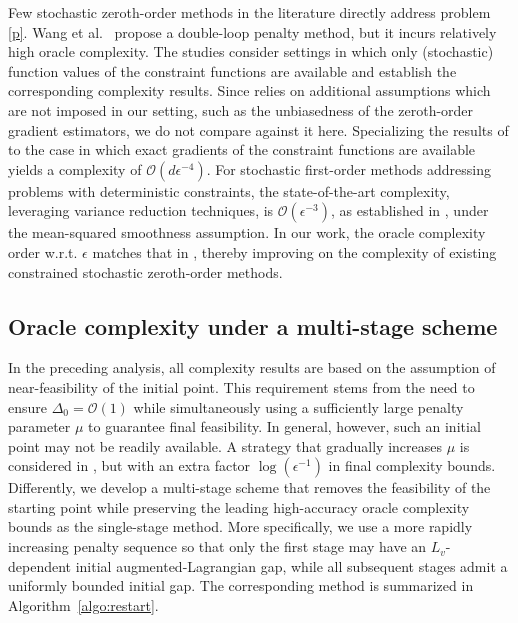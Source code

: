 \documentclass[11pt]{article}
\numberwithin{equation}{section}
\begin{document}
Few stochastic zeroth-order methods in the literature directly address problem \eqref{p}. Wang et al.~\cite{wang2017penalty} propose a double-loop penalty method, but it incurs relatively high oracle complexity. The studies \cite{nguyen2022stochastic,SGG} consider settings in which only (stochastic) function values of the constraint functions are available and establish the corresponding complexity results. {Since \cite{SGG} relies on additional assumptions which are not imposed in our setting, such as the unbiasedness of the zeroth-order gradient estimators,} we do not compare against it here. Specializing the results of \cite{nguyen2022stochastic} to the case in which exact gradients of the constraint functions are available yields a complexity of \(\mathcal{O}(d \epsilon^{-4})\).
For stochastic first-order methods addressing problems with deterministic constraints, the state-of-the-art complexity, leveraging variance reduction techniques, is \(\mathcal{O}(\epsilon^{-3})\), as established in \cite{SWW,lu2026variance}, under the mean-squared smoothness assumption.
In our work, the oracle complexity order w.r.t. $\epsilon$ matches that in \cite{SWW,lu2026variance}, thereby improving on the complexity of existing constrained stochastic zeroth-order methods.


\subsection{Oracle complexity under a multi-stage scheme}
In the preceding analysis, all complexity results are based on the assumption of near-feasibility of the initial point. This requirement  stems from the need to ensure \(\Delta_0=\mathcal O(1)\) while simultaneously using a sufficiently large penalty parameter \(\mu\) to guarantee final feasibility. In general, however, such an initial point may not be readily available. A  strategy that gradually increases \(\mu\) is considered in \cite{alacaoglu2024complexity}, but with an extra factor $\log (\epsilon^{-1})$ in final  complexity bounds. Differently, we develop a multi-stage scheme that removes the feasibility of the starting point while preserving the leading high-accuracy oracle complexity bounds as the single-stage method. More specifically,  we use a more rapidly increasing penalty sequence so that only the first stage may have an \(L_v\)-dependent initial augmented-Lagrangian gap, while all subsequent stages admit a uniformly bounded initial gap. 
The corresponding method is summarized in Algorithm~\ref{algo:restart}. 
\end{document}
